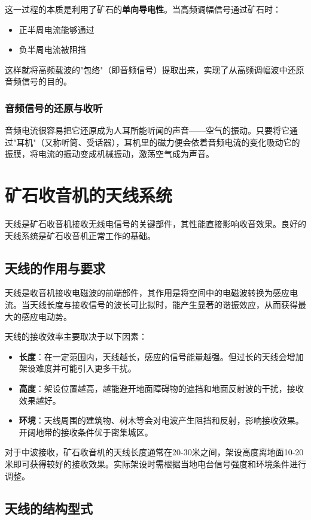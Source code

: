 \documentclass[12pt,UTF8]{ctexbook}
\begin{document}
这一过程的本质是利用了矿石的\textbf{单向导电性}。当高频调幅信号通过矿石时：
\begin{itemize}
	\item 正半周电流能够通过
	\item 负半周电流被阻挡
\end{itemize}
这样就将高频载波的"包络"（即音频信号）提取出来，实现了从高频调幅波中还原音频信号的目的。

\subsection{音频信号的还原与收听}

音频电流很容易把它还原成为人耳所能听闻的声音——空气的振动。只要将它通过"耳机"（又称听筒、受话器），耳机里的磁力便会依着音频电流的变化吸动它的振膜，将电流的振动变成机械振动，激荡空气成为声音。

\chapter{矿石收音机的天线系统}

天线是矿石收音机接收无线电信号的关键部件，其性能直接影响收音效果。良好的天线系统是矿石收音机正常工作的基础。

\section{天线的作用与要求}

天线是收音机接收电磁波的前端部件，其作用是将空间中的电磁波转换为感应电流。当天线长度与接收信号的波长可比拟时，能产生显著的谐振效应，从而获得最大的感应电动势。

天线的接收效率主要取决于以下因素：
\begin{itemize}
	\item \textbf{长度}：在一定范围内，天线越长，感应的信号能量越强。但过长的天线会增加架设难度并可能引入更多干扰。
	\item \textbf{高度}：架设位置越高，越能避开地面障碍物的遮挡和地面反射波的干扰，接收效果越好。
	\item \textbf{环境}：天线周围的建筑物、树木等会对电波产生阻挡和反射，影响接收效果。开阔地带的接收条件优于密集城区。
\end{itemize}

对于中波接收，矿石收音机的天线长度通常在20-30米之间，架设高度离地面10-20米即可获得较好的接收效果。实际架设时需根据当地电台信号强度和环境条件进行调整。

\section{天线的结构型式}
\end{document}
